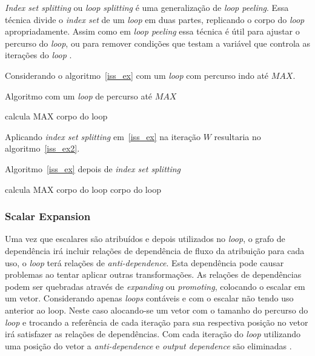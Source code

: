 \textit{Index set splitting} ou \textit{loop splitting} é uma generalização de 
\textit{loop peeling}. Essa técnica divide o \textit{index set} de um
\textit{loop} em duas partes, replicando o corpo do \textit{loop}
apropriadamente. 
Assim como em \textit{loop peeling} essa técnica é útil para ajustar o percurso
do \textit{loop}, ou para remover condições que testam a variável que controla
as iterações do \textit{loop} \cite{hpcfpc}.

Considerando o algoritmo~\ref{iss_ex} com um \textit{loop} com percurso indo
até $MAX$.

\begin{algorithm}
\caption{Algoritmo com um \textit{loop} de percurso até $MAX$}
\label{iss_ex}
\begin{algorithmic}[1]

\STATE calcula MAX
\STATE corpo do loop
\ENDFOR

\end{algorithmic}
\end{algorithm}

Aplicando \textit{index set splitting} em~\ref{iss_ex} na iteração $W$
resultaria no algoritmo~\ref{iss_ex2}.

\begin{algorithm}
\caption{Algoritmo~\ref{iss_ex} depois de \textit{index set splitting}}
\label{iss_ex2}
\begin{algorithmic}[1]

\STATE calcula MAX
\STATE corpo do loop
\ENDFOR
{}
\STATE corpo do loop
\ENDFOR

\end{algorithmic}
\end{algorithm}


\subsubsection{Scalar Expansion} 

Uma vez que escalares são atribuídos e depois utilizados no \textit{loop}, o 
grafo de dependência irá incluir relações de dependência de fluxo da atribuição 
para cada uso, o \textit{loop} terá relações de \textit{anti-dependence}.
Esta dependência pode causar problemas ao tentar aplicar outras transformações.
As relações de dependências podem ser quebradas através de \textit{expanding} ou 
\textit{promoting}, colocando o escalar em um vetor.
Considerando apenas \textit{loops} contáveis e com o escalar não tendo uso
anterior ao loop. Neste caso alocando-se um vetor com o tamanho do percurso do
\textit{loop} e trocando a referência de cada iteração para sua respectiva
posição no vetor irá satisfazer as relações de dependências. Com cada iteração
do \textit{loop} utilizando uma posição do vetor a \textit{anti-dependence} e 
\textit{output dependence} são eliminadas \cite{hpcfpc}.

